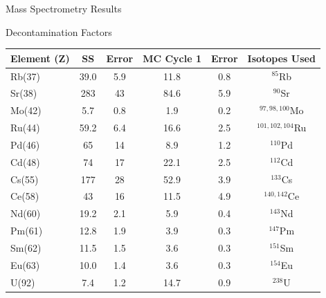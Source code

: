 \documentclass{beamer}
\begin{document}
\begin{frame}{Mass Spectrometry Results}
  \vspace{-0.6cm}
  \begin{block}{Decontamination Factors}
    \begin{center}
      \vskip -0.2cm
  {\fontsize{7}{11.2}\selectfont
  \begin{tabular}{l  c  c c c c}\toprule
   Element (Z)  & SS & Error & MC Cycle 1 & Error & Isotopes Used\\ \midrule 
   Rb(37) & 39.0 & 5.9 & 11.8 & 0.8 & $^{85}$Rb \\
   Sr(38) & 283  & 43  & 84.6 & 5.9 & $^{90}$Sr \\
   Mo(42) & 5.7  & 0.8 & 1.9  & 0.2 & $^{97,98,100}$Mo \\
   Ru(44) & 59.2 & 6.4 & 16.6 & 2.5 & $^{101,102,104}$Ru \\
   Pd(46) & 65   & 14  & 8.9  & 1.2 & $^{110}$Pd \\
   Cd(48) & 74   & 17  & 22.1 & 2.5 & $^{112}$Cd \\
   Cs(55) & 177  & 28  & 52.9 & 3.9 & $^{133}$Cs \\
   Ce(58) & 43   & 16  & 11.5 & 4.9 & $^{140,142}$Ce \\
   Nd(60) & 19.2 & 2.1 & 5.9  & 0.4 & $^{143}$Nd \\
   Pm(61) & 12.8 & 1.9 & 3.9  & 0.3 & $^{147}$Pm \\
   Sm(62) & 11.5 & 1.5 & 3.6  & 0.3 & $^{151}$Sm \\
   Eu(63) & 10.0 & 1.4 & 3.6  & 0.3 & $^{154}$Eu \\
   U(92) & 7.4   & 1.2 & 14.7 & 0.9 & $^{238}$U \\ \bottomrule
  \end{tabular}
  }
  \end{center}
  \end{block}
\end{frame}
\end{document}
